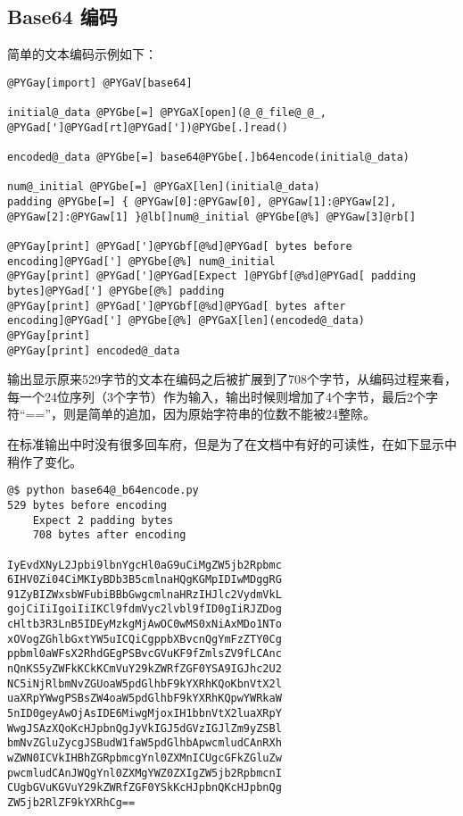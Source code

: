 \documentclass[a4paper,10pt,english]{manual}
\begin{document}
\subsection{Base64 编码}

简单的文本编码示例如下：

\begin{Verbatim}[commandchars=@\[\]]
@PYGay[import] @PYGaV[base64]

initial@_data @PYGbe[=] @PYGaX[open](@_@_file@_@_, @PYGad[']@PYGad[rt]@PYGad['])@PYGbe[.]read()

encoded@_data @PYGbe[=] base64@PYGbe[.]b64encode(initial@_data)

num@_initial @PYGbe[=] @PYGaX[len](initial@_data)
padding @PYGbe[=] { @PYGaw[0]:@PYGaw[0], @PYGaw[1]:@PYGaw[2], @PYGaw[2]:@PYGaw[1] }@lb[]num@_initial @PYGbe[@%] @PYGaw[3]@rb[]

@PYGay[print] @PYGad[']@PYGbf[@%d]@PYGad[ bytes before encoding]@PYGad['] @PYGbe[@%] num@_initial
@PYGay[print] @PYGad[']@PYGad[Expect ]@PYGbf[@%d]@PYGad[ padding bytes]@PYGad['] @PYGbe[@%] padding
@PYGay[print] @PYGad[']@PYGbf[@%d]@PYGad[ bytes after encoding]@PYGad['] @PYGbe[@%] @PYGaX[len](encoded@_data)
@PYGay[print]
@PYGay[print] encoded@_data
\end{Verbatim}

输出显示原来529字节的文本在编码之后被扩展到了708个字节，从编码过程来看，每一个24位序列（3个字节）作为输入，输出时候则增加了4个字节，最后2个字符“==”，则是简单的追加，因为原始字符串的位数不能被24整除。

在标准输出中时没有很多回车府，但是为了在文档中有好的可读性，在如下显示中稍作了变化。

\begin{Verbatim}[commandchars=@\[\]]
@$ python base64@_b64encode.py
529 bytes before encoding
    Expect 2 padding bytes
    708 bytes after encoding

IyEvdXNyL2Jpbi9lbnYgcHl0aG9uCiMgZW5jb2Rpbmc
6IHV0Zi04CiMKIyBDb3B5cmlnaHQgKGMpIDIwMDggRG
91ZyBIZWxsbWFubiBBbGwgcmlnaHRzIHJlc2VydmVkL
gojCiIiIgoiIiIKCl9fdmVyc2lvbl9fID0gIiRJZDog
cHltb3R3LnB5IDEyMzkgMjAwOC0wMS0xNiAxMDo1NTo
xOVogZGhlbGxtYW5uICQiCgppbXBvcnQgYmFzZTY0Cg
ppbml0aWFsX2RhdGEgPSBvcGVuKF9fZmlsZV9fLCAnc
nQnKS5yZWFkKCkKCmVuY29kZWRfZGF0YSA9IGJhc2U2
NC5iNjRlbmNvZGUoaW5pdGlhbF9kYXRhKQoKbnVtX2l
uaXRpYWwgPSBsZW4oaW5pdGlhbF9kYXRhKQpwYWRkaW
5nID0geyAwOjAsIDE6MiwgMjoxIH1bbnVtX2luaXRpY
WwgJSAzXQoKcHJpbnQgJyVkIGJ5dGVzIGJlZm9yZSBl
bmNvZGluZycgJSBudW1faW5pdGlhbApwcmludCAnRXh
wZWN0ICVkIHBhZGRpbmcgYnl0ZXMnICUgcGFkZGluZw
pwcmludCAnJWQgYnl0ZXMgYWZ0ZXIgZW5jb2RpbmcnI
CUgbGVuKGVuY29kZWRfZGF0YSkKcHJpbnQKcHJpbnQg
ZW5jb2RlZF9kYXRhCg==
\end{Verbatim}
\end{document}

